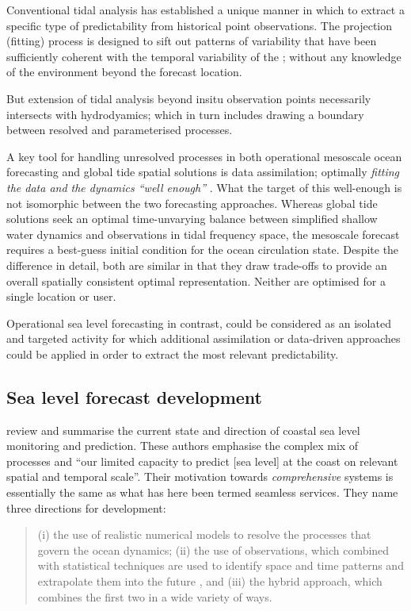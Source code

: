 Conventional tidal analysis has established a unique manner in which to extract a specific type of predictability from historical point observations.
The projection (fitting) process is designed to sift out patterns of variability that have been sufficiently coherent with the temporal variability of the \ATGP{}; without any knowledge of the environment beyond the forecast location.

But extension of tidal analysis beyond insitu observation points necessarily intersects with hydrodyamics; which in turn includes drawing a boundary between resolved and parameterised processes.  

A key tool for handling unresolved processes in both operational mesoscale ocean forecasting and global tide spatial solutions is data assimilation; optimally \textit{fitting the data and the dynamics ``well enough''} \citep{Egbert:1994wz}. 
What the target of this well-enough is not isomorphic between the two forecasting approaches.
Whereas global tide solutions seek an optimal time-unvarying balance between simplified shallow water dynamics and observations in tidal frequency space, the mesoscale forecast requires a best-guess initial condition for the ocean circulation state.  
Despite the difference in detail, both are similar in that they draw trade-offs to provide an overall spatially consistent optimal representation.   Neither are optimised for a single location or user.

Operational sea level forecasting in contrast, could be considered as an isolated and targeted activity for which additional assimilation or data-driven approaches could be applied in order to extract the most relevant predictability. 

\subsection{Sea level forecast development}
\citep{10.3389/fmars.2019.00437} review and summarise the current state and direction of coastal sea level monitoring and prediction.   These authors emphasise the complex mix of processes and ``our limited capacity to predict [sea level] at the coast on relevant spatial and temporal scale''.
Their motivation towards \emph{comprehensive} systems is essentially the same as what has here been termed seamless services. 
They name three directions for development:
\begin{quote}
(i) the use of realistic numerical models to resolve the processes that govern the ocean dynamics; (ii) the use of observations, which combined with statistical techniques are used to identify space and time patterns and extrapolate them into the future , and (iii) the hybrid approach, which combines the first two in a wide variety of ways.
\end{quote} 

